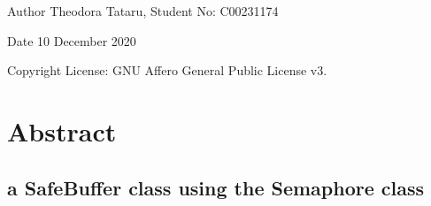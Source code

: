 \begin{DoxyAuthor}{Author}
Theodora Tataru, Student No\+: C00231174~\newline
 
\end{DoxyAuthor}
\begin{DoxyDate}{Date}
10 December 2020 
\end{DoxyDate}
\begin{DoxyCopyright}{Copyright}
License\+: G\+NU Affero General Public License v3. 
\end{DoxyCopyright}
\hypertarget{index_Abstract}{}\section{Abstract}\label{index_Abstract}
\hypertarget{index_Implement}{}\subsection{a Safe\+Buffer class using the Semaphore class}\label{index_Implement}
